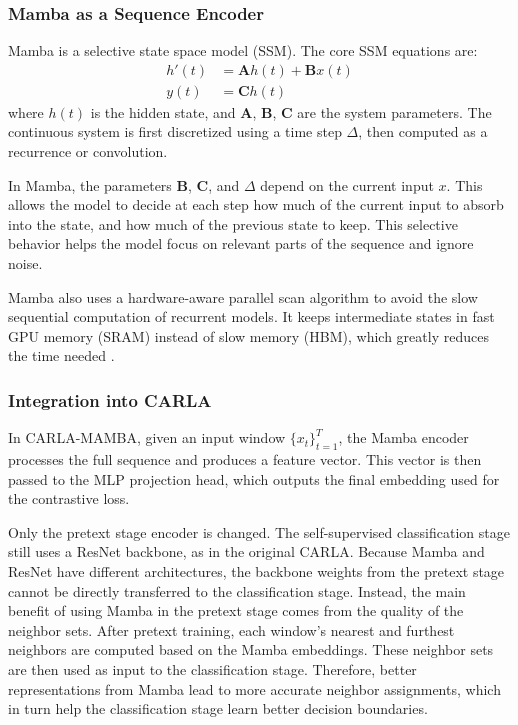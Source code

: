 \documentclass{svproc}
\begin{document}
\subsubsection{Mamba as a Sequence Encoder}

Mamba \cite{gu2023mamba} is a selective state space model (SSM). The core SSM equations are:
\begin{align}
h'(t) &= \mathbf{A}h(t) + \mathbf{B}x(t) \\
y(t) &= \mathbf{C}h(t)
\end{align}
where $h(t)$ is the hidden state, and $\mathbf{A}$, $\mathbf{B}$, $\mathbf{C}$ are the system parameters. The continuous system is first discretized using a time step $\Delta$, then computed as a recurrence or convolution.

In Mamba, the parameters $\mathbf{B}$, $\mathbf{C}$, and $\Delta$ depend on the current input $x$. This allows the model to decide at each step how much of the current input to absorb into the state, and how much of the previous state to keep. This selective behavior helps the model focus on relevant parts of the sequence and ignore noise.

Mamba also uses a hardware-aware parallel scan algorithm to avoid the slow sequential computation of recurrent models. It keeps intermediate states in fast GPU memory (SRAM) instead of slow memory (HBM), which greatly reduces the time needed \cite{gu2023mamba}.

\subsubsection{Integration into CARLA}

In CARLA-MAMBA, given an input window $\{x_t\}_{t=1}^{T}$, the Mamba encoder processes the full sequence and produces a feature vector. This vector is then passed to the MLP projection head, which outputs the final embedding used for the contrastive loss.

Only the pretext stage encoder is changed. The self-supervised classification stage still uses a ResNet backbone, as in the original CARLA. Because Mamba and ResNet have different architectures, the backbone weights from the pretext stage cannot be directly transferred to the classification stage. Instead, the main benefit of using Mamba in the pretext stage comes from the quality of the neighbor sets. After pretext training, each window's nearest and furthest neighbors are computed based on the Mamba embeddings. These neighbor sets are then used as input to the classification stage. Therefore, better representations from Mamba lead to more accurate neighbor assignments, which in turn help the classification stage learn better decision boundaries.
\end{document}
